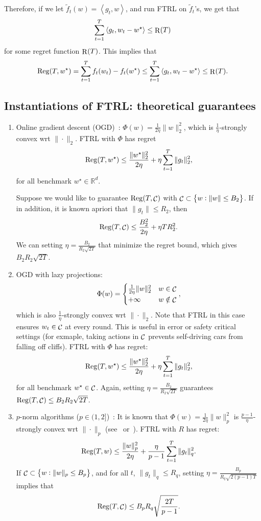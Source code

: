 \documentclass{article}
\DeclareMathOperator*{\Reg}{{\rm Reg}}
\DeclareMathOperator*{\R}{{\rm R}}
\DeclareMathOperator*{\Ccal}{{\cal C}}
\newcommand{\RR}{\mathbb{R}} %
\newcommand{\inner}[2]{\left\langle #1,#2 \right\rangle}
\begin{document}
Therefore, if we let $\tilde{f}_t(w) = \inner{g_t}{w}$, and run FTRL on $\tilde{f}_t$'s, we get that
\[ \sum_{t=1}^T \inner{g_t}{w_t - w^\star} \leq \R(T) \]
for some regret function $\R(T)$. This implies that
\[ \Reg(T, w^\star) = \sum_{t=1}^T f_t(w_t) - f_t(w^\star) \leq \sum_{t=1}^T \inner{g_t}{w_t - w^\star} \leq \R(T). \]

\subsection{Instantiations of FTRL: theoretical guarantees}

\begin{enumerate}
  \item Online gradient descent (OGD)~\cite{zinkevich2003online}: $\Phi(w) = \frac{1}{2\eta}\| w \|_2^2$, which is $\frac1\eta$-strongly convex wrt $\| \cdot \|_2$. FTRL with $\Phi$ has regret
  \[ \Reg(T, w^\star) \leq \frac{\| w^\star \|_2^2}{2\eta} + \eta \sum_{t=1}^T \| g_t \|_2^2, \]
  for all benchmark $w^\star \in \RR^d$.

  Suppose we would like to guarantee $\Reg(T, \Ccal)$ with
  $\Ccal \subset \cbr{w: \| w\| \leq B_2}$.
  If in addition, it is known apriori that $\| g_t \| \leq R_2$, then
  \[ \Reg(T, \Ccal) \leq \frac{B_2^2}{2\eta} + \eta T R_2^2. \]
  We can setting $\eta = \frac{B_2}{R_2\sqrt{2T}}$ that minimize the regret bound, which gives $B_2 R_2 \sqrt{2T}$.

  \item OGD with lazy projections:
  \[ \Phi(w) = \begin{cases} \frac{1}{2\eta}\| w \|_2^2 & w \in \Ccal \\ +\infty & w \notin \Ccal \end{cases}, \]
  which is also $\frac1\eta$-strongly convex wrt $\| \cdot \|_2$. Note that FTRL in this case ensures $w_t \in \Ccal$ at every round. This is useful in error or safety critical settings (for exmaple, taking actions in $\Ccal$ prevents self-driving cars from falling off cliffs).
  FTRL with $\Phi$ has regret:
  \[ \Reg(T, w^\star) \leq \frac{\| w^\star \|_2^2}{2\eta} + \eta \sum_{t=1}^T \| g_t \|_2^2, \]
  for all benchmark $w^\star \in \Ccal$. Again, setting $\eta = \frac{B_2}{R_2\sqrt{2T}}$ guarantees $\Reg(T, \Ccal) \leq B_2 R_2 \sqrt{2T}$.

  \item $p$-norm algorithms ($p \in (1, 2]$)~\cite{grove2001general,gentile2003robustness}:
  It is known that $\Phi(w) = \frac{1}{2\eta}\| w \|_p^2$ is $\frac{p-1}\eta$-strongly convex wrt $\| \cdot \|_p$ (see~\cite[][Lemma 17]{shalev2007online} or~\cite[cesa2006prediction][Corollary 2.1]{}). FTRL with $R$ has regret:
  \[ \Reg(T, w) \leq \frac{\| w \|_p^2}{2\eta} + \frac{\eta}{p-1} \sum_{t=1}^T \| g_t \|_q^2. \]
  If $\Ccal \subset \cbr{w: \| w \|_p \leq B_p}$, and for all $t$, $\| g_t \|_q \leq R_q$,
  setting $\eta = \frac{B_p}{R_q\sqrt{2(p-1)T}}$ implies that
  \[ \Reg(T, \Ccal) \leq B_p R_q \sqrt{\frac{2T}{p-1}}. \]


\end{enumerate}
\end{document}
